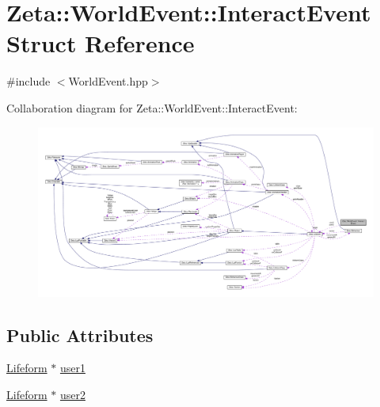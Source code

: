 \hypertarget{structZeta_1_1WorldEvent_1_1InteractEvent}{\section{Zeta\+:\+:World\+Event\+:\+:Interact\+Event Struct Reference}
\label{structZeta_1_1WorldEvent_1_1InteractEvent}
}


{\ttfamily \#include $<$World\+Event.\+hpp$>$}



Collaboration diagram for Zeta\+:\+:World\+Event\+:\+:Interact\+Event\+:
\nopagebreak
\begin{figure}[H]
\begin{center}
\leavevmode
\includegraphics[width=350pt]{structZeta_1_1WorldEvent_1_1InteractEvent__coll__graph}
\end{center}
\end{figure}
\subsection*{Public Attributes}
\begin{DoxyCompactItemize}
\item 
\hyperlink{classZeta_1_1Lifeform}{Lifeform} $\ast$ \hyperlink{structZeta_1_1WorldEvent_1_1InteractEvent_a14b39bc56740da876999b43dbef4ab07}{user1}
\item 
\hyperlink{classZeta_1_1Lifeform}{Lifeform} $\ast$ \hyperlink{structZeta_1_1WorldEvent_1_1InteractEvent_a23b10dc79715de1a0b40df45181b804b}{user2}
\end{DoxyCompactItemize}


